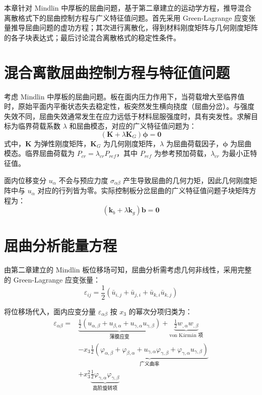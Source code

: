 
本章针对 Mindlin 中厚板的屈曲问题，基于第二章建立的运动学方程，推导混合离散格式下的屈曲控制方程与广义特征值问题。首先采用 Green-Lagrange 应变张量推导屈曲问题的虚功方程；其次进行离散化，得到材料刚度矩阵与几何刚度矩阵的各子块表达式；最后讨论混合离散格式的稳定性条件。

\section{混合离散屈曲控制方程与特征值问题}

考虑 Mindlin 中厚板的屈曲问题。板在面内压力作用下，当荷载增大至临界值时，原始平面内平衡状态失去稳定性，板突然发生横向挠度（屈曲分岔）。与强度失效不同，屈曲失效通常发生在应力远低于材料屈服强度时，具有突发性。求解目标为临界荷载系数 $\lambda$ 和屈曲模态，对应的广义特征值问题为：
\begin{equation}
(\mathbf{K} + \lambda \mathbf{K}_G)\boldsymbol{\phi} = \mathbf{0}
\end{equation}
式中，$\mathbf{K}$ 为弹性刚度矩阵，$\mathbf{K}_G$ 为几何刚度矩阵，$\lambda$ 为屈曲荷载因子，$\boldsymbol{\phi}$ 为屈曲模态。临界屈曲荷载为 $P_{cr} = \lambda_{cr} P_{ref}$，其中 $P_{ref}$ 为参考预加荷载，$\lambda_{cr}$ 为最小正特征值。

面内位移变分 $u_\alpha$ 不会与预应力度 $\sigma_{\alpha\beta}$ 产生导致屈曲的几何力矩，因此几何刚度矩阵中与 $u_\alpha$ 对应的行列皆为零。实际控制板分岔屈曲的广义特征值问题子块矩阵方程为：
\begin{equation}
(\mathbf{k}_b + \lambda \mathbf{k}_g)\mathbf{b} = \mathbf{0}
\end{equation}

\section{屈曲分析能量方程}

由第二章建立的 Mindlin 板位移场可知，屈曲分析需考虑几何非线性，采用完整的 Green-Lagrange 应变张量：
\begin{equation}
\varepsilon_{ij} = \frac{1}{2}(\bar{u}_{i,j} + \bar{u}_{j,i} + \bar{u}_{k,i}\bar{u}_{k,j})
\end{equation}

将位移场代入，面内应变分量 $\varepsilon_{\alpha\beta}$ 按 $x_3$ 的幂次分项归类为：
\begin{equation}
\begin{aligned}
\varepsilon_{\alpha\beta} =& \underbrace{\frac{1}{2}(u_{\alpha,\beta} + u_{\beta,\alpha} + u_{\gamma,\alpha}u_{\gamma,\beta})}_{\text{薄膜应变}} + \underbrace{\frac{1}{2}w_{,\alpha}w_{,\beta}}_{\text{von K\'arm\'an 项}} \\
&- x_3\underbrace{\frac{1}{2}(\varphi_{\alpha,\beta} + \varphi_{\beta,\alpha} + u_{\gamma,\alpha}\varphi_{\gamma,\beta} + \varphi_{\gamma,\alpha}u_{\gamma,\beta})}_{\text{广义曲率}} \\
&+ x_3^2\underbrace{\frac{1}{2}\varphi_{\gamma,\alpha}\varphi_{\gamma,\beta}}_{\text{高阶旋转项}}
\end{aligned}
\end{equation}

